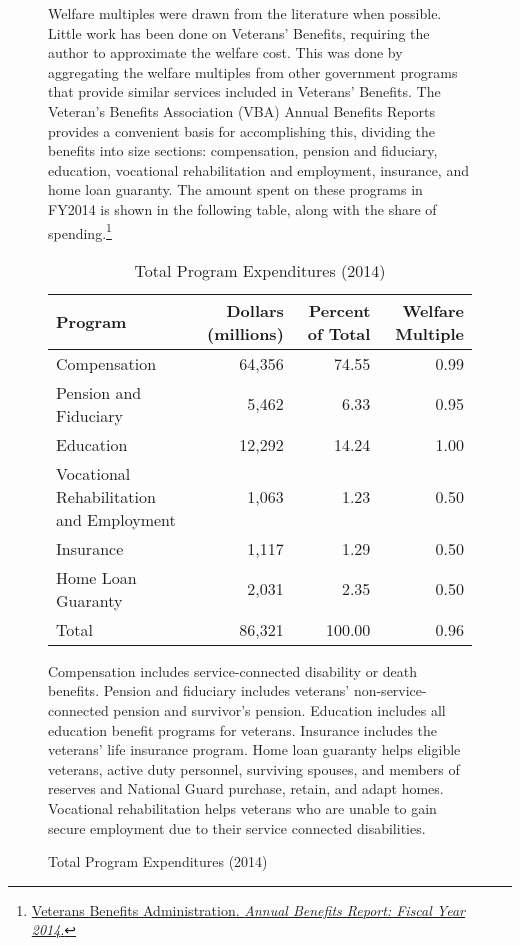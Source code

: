 \documentclass{article}
\begin{document}
\begin{figure}[H]
Welfare multiples were drawn from the literature when possible. Little work has been done on Veterans' Benefits, requiring the author to approximate the welfare cost. This was done by aggregating the welfare multiples from other government programs that provide similar services included in Veterans' Benefits. The Veteran's Benefits Association (VBA) Annual Benefits Reports provides a convenient basis for accomplishing this, dividing the benefits into size sections: compensation, pension and fiduciary, education, vocational rehabilitation and employment, insurance, and home loan guaranty. The amount spent on these programs in FY2014 is shown in the following table, along with the share of spending.\footnote{\href{http://www.benefits.va.gov/REPORTS/abr/ABR-IntroAppendix-FY14-11032015.pdf}{Veterans Benefits Administration. \textit{Annual Benefits Report: Fiscal Year 2014}.}}

\begin{table}[H]
\caption{Total Program Expenditures (2014)}
\begin{center}
\begin{adjustbox}{max width=\textwidth}
\begin{tabular}{lrrr}
\toprule
Program 									&  Dollars (millions) 	& Percent of Total	&	Welfare Multiple 	\\
\midrule
Compensation 								&	64,356				& 74.55				&	0.99				\\		
Pension and Fiduciary 						&	5,462				& 6.33				&	0.95				\\
Education 									&	12,292				& 14.24				&	1.00				\\
Vocational Rehabilitation and Employment 	&	1,063				& 1.23				&	0.50				\\
Insurance									&	1,117				& 1.29				&	0.50				\\
Home Loan Guaranty 							& 	2,031				& 2.35				&	0.50				\\
Total 										& 	86,321				& 100.00			&	0.96				\\
\bottomrule
\end{tabular}
\end{adjustbox}
\end{center}
\end{table}

Compensation includes service-connected disability or death benefits. Pension and fiduciary includes veterans' non-service-connected pension and survivor's pension. Education includes all education benefit programs for veterans. Insurance includes the veterans' life insurance program. Home loan guaranty helps eligible veterans, active duty personnel, surviving spouses, and members of reserves and National Guard purchase, retain, and adapt homes. Vocational rehabilitation helps veterans who are unable to gain secure employment due to their service connected disabilities.


\end{figure}
\end{document}
